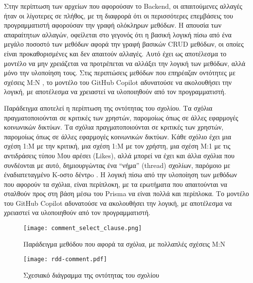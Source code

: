 Στην περίπτωση των αρχείων που αφορούσαν το \textlatin{Backend}, οι
απαιτούμενες αλλαγές ήταν οι λίγοτερες σε πλήθος, με τη διαφρορά ότι οι
περισσότερες επεμβάσεις του προγραμματιστή αφορούσαν την γραφή ολόκληρων
μεθόδων. Η απουσία των απαραίτητων αλλαγών, οφείλεται στο γεγονός ότι η
βασική λογική πίσω από ένα μεγάλο ποσοστό των μεθόδων αφορά την γραφή
βασικών \textlatin{CRUD} μεθόδων, οι οποίες είναι προκαθορισμένες και
δεν απαιτούν αλλαγές. Αυτό έχει ως αποτέλεσμα το μοντέλο να μην
χρειάζεται να προτρέπεται να αλλάξει την λογική των μεθόδων, αλλά μόνο
την υλοποίηση τους. Στις περιπτώσεις μεθόδων που επηρέαζαν οντότητες με
σχέσεις Μ:Ν \cite{prisma2022manytomany}, το μοντέλο του
\textlatin{GitHub Copilot} αδυνατούσε να ακολουθήσει την λογική, με
αποτέλεσμα να χρειαστεί να υλοποιηθούν από τον προγραμματιστή.

Παράδειγμα αποτελεί η περίπτωση της οντότητας του σχολίου. Τα σχόλια
πραγματοποιούνται σε κριτικές των χρηστών, παρομοίως όπως σε άλλες
εφαρμογές κοινωνικών δικτύων. Τα σχόλια πραγματοποιούνται σε κριτικές
των χρηστών, παρομοίως όπως σε άλλες εφαρμογές κοινωνικών δικτύων. Κάθε
σχόλιο έχει μια σχέση 1:Μ με την κριτική, μια σχέση 1:Μ με τον χρήστη,
μια σχέση Μ:1 με τις αντιδράσεις τύπου Μου αρέσει \textlatin{(Likes)},
αλλά μπορεί να έχει και άλλα σχόλια που συνδέονται με αυτό,
δημιουργώντας ένα \enquote{νήμα} \textlatin{(thread)} σχολίων, παρόμοιο
με έναδιατεταγμένο Κ-οστο δέντρo \cite{gabillon2002access}. Η λογική
πίσω από την υλοποίηση των μεθόδων που αφορούν τα σχόλια, είναι
περίπλοκη, με τα ερωτήματα που απαιτούνται να σταλθούν προς στη βάση
μέσω του \textlatin{Prisma} να είναι πολλά και περίπλοκα. Το μοντέλο του
\textlatin{GitHub Copilot} αδυνατούσε να ακολουθήσει την λογική, με
αποτέλεσμα να χρειαστεί να υλοποιηθούν από τον προγραμματιστή.

\begin{figure}[H]
  \begin{center}
    \texttt{[image: comment\_select\_clause.png]}
    \caption{Παράδειγμα μεθόδου που αφορά τα σχόλια, με πολλαπλές
      σχέσεις Μ:Ν}
  \end{center}
  \label{fig:commentSelectClause}
\end{figure}

\begin{figure}[H]
  \begin{center}
    \texttt{[image: rdd-comment.pdf]}
    \caption{Σχεσιακό διάγραμμα της οντότητας του σχολίου}
  \end{center}
  \label{fig:commentRdd}
\end{figure}


